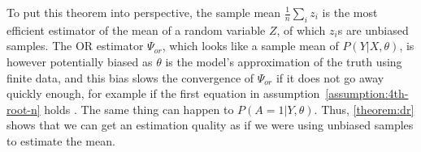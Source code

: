 To put this theorem into perspective, the sample mean $\frac{1}{n}\sum_i z_i$ is the most efficient estimator of the mean of a random variable $Z$, of which $z_i$s are unbiased samples. The OR estimator $\Psi_{or}$, which looks like a sample mean of $P(Y|X,\theta)$, is however potentially biased as $\theta$ is the model's approximation of the truth using finite data, and this bias slows the convergence of $\Psi_{or}$ if it does not go away quickly enough, for example if the first equation in assumption~\ref{assumption:4th-root-n} holds \cite{dml}. The same thing can happen to $P(A=1|Y,\theta)$. Thus, \cref{theorem:dr} shows that we can get an estimation quality as if we were using unbiased samples to estimate the mean. 

